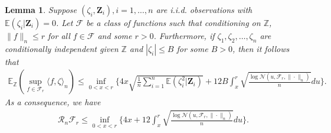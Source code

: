 \documentclass[11pt, preprint]{imsart}
\numberwithin{equation}{section}
\def \mcF{\mathcal{F}}
\def \mcRn{\mathcal{R}_n}
\def \mcN{\mathcal{N}}
\def \bfZ{\mathbf{Z}}
\def \ev{\mathbb{E}}
\theoremstyle{plain}
\newtheorem{lemma}{\indent Lemma}
\theoremstyle{definition}
\begin{document}
\begin{lemma}\label{lemma:dudley:inequality}
Suppose $(\zeta_i, \bfZ_i), i=1,\ldots, n$ are i.i.d. observations with $\ev(\zeta_i | \bfZ_i)=0$. Let $\mcF$ be a class of functions such that conditioning on $\mathbb{Z}$, $\|f\|_n\leq r$ for all $f\in \mcF$ and some $r>0$. Furthermore, if $\zeta_1,\zeta_2, \ldots, \zeta_n$ are conditionally independent given $\mathbb{Z}$ and $|\zeta_i|\leq B$ for some $B>0$, then it follows that
\begin{eqnarray}
	\ev_{\mathbb{Z}}(\sup_{f\in \mcF_r}\langle f, \zeta \rangle_n)\leq \inf_{0<x<r}\bigg\{4x\sqrt{\frac{1}{n}\sum_{i=1}^n\ev(\zeta_i^2 |\bfZ_i)}+12B\int_{x}^{r}\sqrt{\frac{\log \mcN(u, \mcF_r, \|\cdot\|_n)}{n}}du\bigg\}.\nonumber
\end{eqnarray}
As a consequence, we have
\begin{eqnarray}
	\mcRn\mcF_r\leq \inf_{0<x<r}\bigg\{4x+12\int_{x}^{r}\sqrt{\frac{\log \mcN(u, \mcF_r, \|\cdot\|_n)}{n}}du\bigg\}.\nonumber
\end{eqnarray}
\end{lemma}
\end{document}
